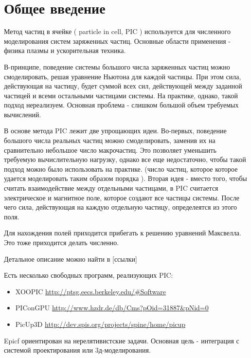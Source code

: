 \section{Общее введение}
Метод частиц в ячейке ( particle in cell, PIC ) используется для 
численного моделирования систем заряженных частиц. 
Основные области применения - физика плазмы и ускорительная техника.

В-принципе, поведение системы большого числа заряженных 
частиц можно смоделировать, решая  уравнение Ньютона для каждой частицы.
При этом сила, действующая на частицу, будет суммой всех сил,
действующей между заданной частицей и всеми остальными частицами системы.
На практике, однако, такой подход нереализуем. Основная проблема - слишком
большой объем требуемых вычислений. 

В основе метода PIC лежит две упрощающих идеи. 
Во-первых, поведение большого числа реальных частиц можно 
смоделировать, заменив их на сравнительно небольшое число макрочастиц. 
Это позволяет уменьшить требуемую вычислительную нагрузку, однако все еще
недостаточно, чтобы такой подход можно было использовать на практике.
(число частиц, которое которое удается моделировать таким образом порядка  ).
Вторая идея - вместо того, чтобы считать взаимодействие между отдельными 
частицами, в PIC считается электрическое и магнитное поле, которое
создают все частицы системы. После чего сила, действующая на каждую отдельную
частицу, определеятся из этого поля. 

Для нахождения полей приходится прибегать к решению уравнений Максвелла.
Это тоже приходится делать численно. 

Детальное описание можно найти в [ссылки]

Есть несколько свободных программ, реализующих PIC:

\begin{itemize}
\item XOOPIC \url{http://ptsg.eecs.berkeley.edu/#Software}
\item PIConGPU \url{http://www.hzdr.de/db/Cms?pOid=31887&pNid=0}
\item PicUp3D \url{http://dev.spis.org/projects/spine/home/picup}
\end{itemize}

Epicf ориентирован на нерелятивистские задачи.
Основная цель - интеграция с системой проектирования или 3д-моделирования.



